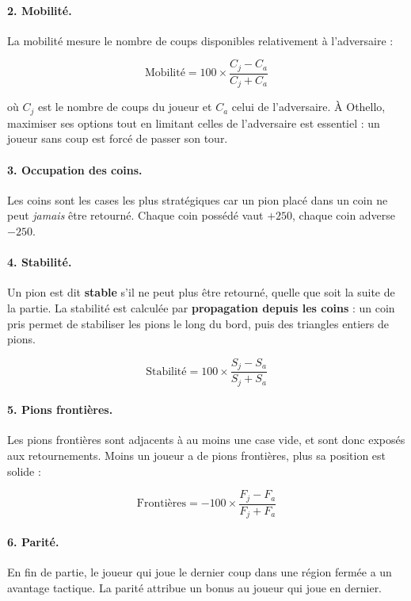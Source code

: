 \documentclass[12pt, a4paper]{article}
\begin{document}
\paragraph{2. Mobilité.}
La mobilité mesure le nombre de coups disponibles relativement à l'adversaire :

\begin{equation}
    \text{Mobilité} = 100 \times \frac{C_j - C_a}{C_j + C_a}
\end{equation}

où $C_j$ est le nombre de coups du joueur et $C_a$ celui de l'adversaire. À Othello, maximiser ses options tout en limitant celles de l'adversaire est essentiel : un joueur sans coup est forcé de passer son tour.

\paragraph{3. Occupation des coins.}
Les coins sont les cases les plus stratégiques car un pion placé dans un coin ne peut \textit{jamais} être retourné. Chaque coin possédé vaut $+250$, chaque coin adverse $-250$.

\paragraph{4. Stabilité.}
Un pion est dit \textbf{stable} s'il ne peut plus être retourné, quelle que soit la suite de la partie. La stabilité est calculée par \textbf{propagation depuis les coins} : un coin pris permet de stabiliser les pions le long du bord, puis des triangles entiers de pions.

\begin{equation}
    \text{Stabilité} = 100 \times \frac{S_j - S_a}{S_j + S_a}
\end{equation}

\paragraph{5. Pions frontières.}
Les pions frontières sont adjacents à au moins une case vide, et sont donc exposés aux retournements. Moins un joueur a de pions frontières, plus sa position est solide :

\begin{equation}
    \text{Frontières} = -100 \times \frac{F_j - F_a}{F_j + F_a}
\end{equation}

\paragraph{6. Parité.}
En fin de partie, le joueur qui joue le dernier coup dans une région fermée a un avantage tactique. La parité attribue un bonus au joueur qui joue en dernier.
\end{document}
